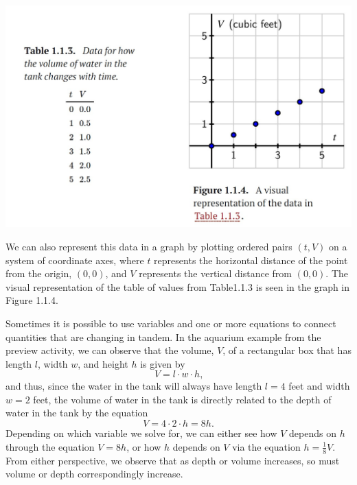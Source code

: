 \documentclass{ximera}
\begin{document}
\includegraphics[width=\textwidth]{APCfigure1.1.3.jpg}

We can also represent this data in a graph by plotting ordered pairs \((t,V)\) on a system of coordinate axes, where \(t\) represents the horizontal distance of the point from the origin, \((0,0)\), and \(V\) represents the vertical distance from \((0,0)\).  The visual representation of the table of values from Table1.1.3  is seen in the graph in Figure 1.1.4.%


Sometimes it is possible to use variables and one or more equations to connect quantities that are changing in tandem.  In the aquarium example from the preview activity, we can observe that the volume, \(V\), of a rectangular box that has length \(l\), width \(w\), and height \(h\) is given by%
\begin{equation*}
V = l \cdot w \cdot h\text{,}
\end{equation*}
and thus, since the water in the tank will always have length \(l = 4\) feet and width \(w = 2\) feet, the volume of water in the tank is directly related to the depth of water in the tank by the equation%
\begin{equation*}
V = 4 \cdot 2 \cdot h = 8h\text{.}
\end{equation*}
Depending on which variable we solve for, we can either see how \(V\) depends on \(h\) through the equation \(V = 8h\), or how \(h\) depends on \(V\) via the equation \(h = \frac{1}{8}V\).  From either perspective, we observe that as depth or volume increases, so must volume or depth correspondingly increase.%
\end{document}
